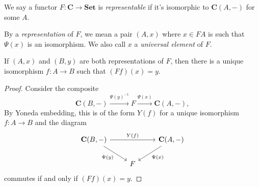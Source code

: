 \documentclass[a4paper]{article}
\renewcommand{\c}[1]{\mathbf{#1}}
\newcommand{\Set}{{\c{Set}}}
\begin{document}
\begin{definition}
  We say a functor \(F: \c C \to \Set\) is \emph{representable} if it's isomorphic to \(\c C(A, -)\) for some \(A\).

  By a \emph{representation} of \(F\), we mean a pair \((A, x)\) where \(x \in FA\) is such that \(\Psi(x)\) is an isomorphism. We also call \(x\) a \emph{universal element} of \(F\).
\end{definition}

\begin{corollary}
  If \((A, x)\) and \((B, y)\) are both representations of \(F\), then there is a unique isomorphism \(f: A \to B\) such that \((Ff)(x) = y\).
\end{corollary}

\begin{proof}
  Consider the composite
  \[
    \c C(B, -) \xrightarrow{\Psi(y)^{-1}} F \xrightarrow{\Psi(x)} \c C(A, -),
  \]
  By Yoneda embedding, this is of the form \(Y(f)\) for a unique isomorphism \(f: A \to B\) and the diagram
  \[
    \begin{tikzcd}
      \c C(B, -) \ar[rr, "Y(f)"] \ar[dr, "\Psi(y)"'] & & \c C(A, -) \ar[dl, "\Psi(x)"] \\
      & F
    \end{tikzcd}
  \]
  commutes if and only if \((Ff) (x) = y\).
\end{proof}
\end{document}
